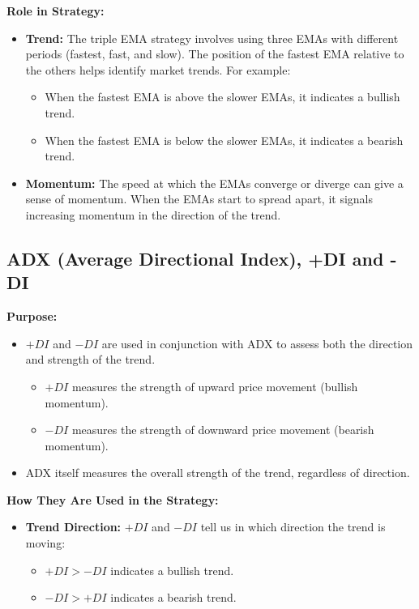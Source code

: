 \documentclass[12pt]{article}
\begin{document}
\textbf{Role in Strategy:}
\begin{itemize}
    \item \textbf{Trend:} The triple EMA strategy involves using three EMAs with different periods (fastest, fast, and slow). The position of the fastest EMA relative to the others helps identify market trends. For example:
    \begin{itemize}
        \item When the fastest EMA is above the slower EMAs, it indicates a bullish trend.
        \item When the fastest EMA is below the slower EMAs, it indicates a bearish trend.
    \end{itemize}
    \item \textbf{Momentum:} The speed at which the EMAs converge or diverge can give a sense of momentum. When the EMAs start to spread apart, it signals increasing momentum in the direction of the trend.
\end{itemize}

\newpage

\subsection{ADX (Average Directional Index), +DI and -DI}

\textbf{Purpose:}
\begin{itemize}
    \item $+DI$ and $-DI$ are used in conjunction with ADX to assess both the direction and strength of the trend.
    \begin{itemize}
        \item $+DI$ measures the strength of upward price movement (bullish momentum).
        \item $-DI$ measures the strength of downward price movement (bearish momentum).
    \end{itemize}
    \item ADX itself measures the overall strength of the trend, regardless of direction.
\end{itemize}

\textbf{How They Are Used in the Strategy:}
\begin{itemize}
    \item \textbf{Trend Direction:} $+DI$ and $-DI$ tell us in which direction the trend is moving:
    \begin{itemize}
        \item $+DI > -DI$ indicates a bullish trend.
        \item $-DI > +DI$ indicates a bearish trend.
    \end{itemize}
\end{itemize}
\end{document}
